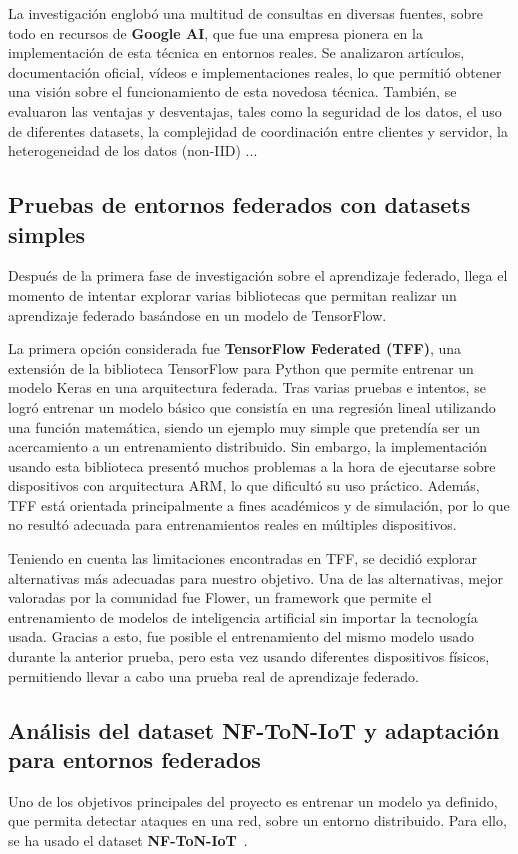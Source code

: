 La investigación englobó una multitud de consultas en diversas fuentes, sobre todo en recursos de \textbf{Google AI}, que fue una empresa pionera en la implementación de esta técnica en entornos reales. Se analizaron artículos, documentación oficial, vídeos e implementaciones reales, lo que permitió obtener una visión sobre el funcionamiento de esta novedosa técnica. También, se evaluaron las ventajas y desventajas, tales como la seguridad de los datos, el uso de diferentes datasets, la complejidad de coordinación entre clientes y servidor, la heterogeneidad de los datos (non-IID) ... 

\subsection{Pruebas de entornos federados con datasets simples}
\label{subsec:PruebasEntornosFederados}
Después de la primera fase de investigación sobre el aprendizaje federado, llega el momento de intentar explorar varias bibliotecas que permitan realizar un aprendizaje federado basándose en un modelo de TensorFlow.

La primera opción considerada fue \textbf{TensorFlow Federated (TFF)}, una extensión de la biblioteca TensorFlow para Python que permite entrenar un modelo Keras en una arquitectura federada. Tras varias pruebas e intentos, se logró entrenar un modelo básico que consistía en una regresión lineal utilizando una función matemática, siendo un ejemplo muy simple que pretendía ser un acercamiento a un entrenamiento distribuido. Sin embargo, la implementación usando esta biblioteca presentó muchos problemas a la hora de ejecutarse sobre dispositivos con arquitectura ARM, lo que dificultó su uso práctico. Además, TFF está orientada principalmente a fines académicos y de simulación, por lo que no resultó adecuada para entrenamientos reales en múltiples dispositivos.

Teniendo en cuenta las limitaciones encontradas en TFF, se decidió explorar alternativas más adecuadas para nuestro objetivo. Una de las alternativas, mejor valoradas por la comunidad fue Flower, un framework que permite el entrenamiento de modelos de inteligencia artificial sin importar la tecnología usada. Gracias a esto, fue posible el entrenamiento del mismo modelo usado durante la anterior prueba, pero esta vez usando diferentes dispositivos físicos, permitiendo llevar a cabo una prueba real de aprendizaje federado.

\subsection{Análisis del dataset NF-ToN-IoT y adaptación para entornos federados}
\label{subsec:AnalisisDataset}
Uno de los objetivos principales del proyecto es entrenar un modelo ya definido, que permita detectar ataques en una red, sobre un entorno distribuido. Para ello, se ha usado el dataset \textbf{NF-ToN-IoT}~\cite{dataset_source}.

